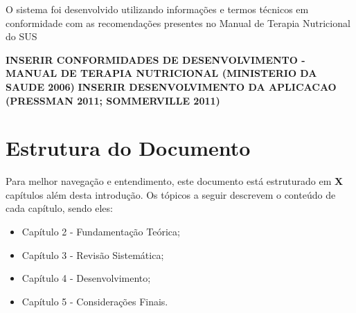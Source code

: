 O sistema foi desenvolvido utilizando informações e termos técnicos em conformidade com as recomendações presentes no Manual de Terapia Nutricional do SUS \cite{manualnutricao2016}

\textbf{INSERIR CONFORMIDADES DE DESENVOLVIMENTO - MANUAL DE TERAPIA NUTRICIONAL  (MINISTERIO DA SAUDE 2006)}
\textbf{INSERIR DESENVOLVIMENTO DA APLICACAO (PRESSMAN 2011; SOMMERVILLE 2011)}

\section{Estrutura do Documento}\label{sec-divisoes}
Para melhor navegação e entendimento, este documento está estruturado em \textbf{X} capítulos além desta introdução. Os tópicos a seguir descrevem o conteúdo de cada capítulo, sendo eles:
\begin{itemize}
 \item Capítulo 2 - Fundamentação Teórica;

 \item Capítulo 3 - Revisão Sistemática;

 \item Capítulo 4 - Desenvolvimento;
 
 \item Capítulo 5 - Considerações Finais.
\end{itemize}